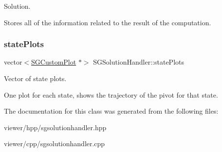 Solution. 

Stores all of the information related to the result of the computation. \mbox{\label{classSGSolutionHandler_acdd63bfa69bbffd3dadc4bec4b1b7948}} 
\subsubsection{\texorpdfstring{state\+Plots}{statePlots}}
{\footnotesize\ttfamily vector$<$\hyperlink{classSGCustomPlot}{S\+G\+Custom\+Plot} $\ast$$>$ S\+G\+Solution\+Handler\+::state\+Plots\hspace{0.3cm}{\ttfamily [private]}}



Vector of state plots. 

One plot for each state, shows the trajectory of the pivot for that state. 

The documentation for this class was generated from the following files\+:\begin{DoxyCompactItemize}
\item 
viewer/hpp/sgsolutionhandler.\+hpp\item 
viewer/cpp/sgsolutionhandler.\+cpp\end{DoxyCompactItemize}
